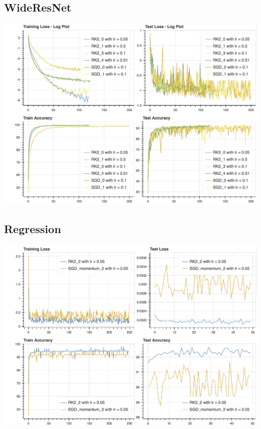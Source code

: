 \documentclass[a0,portrait]{a0poster}
\begin{document}
\begin{multicols}{3}
\subsection*{WideResNet}
\begin{center}\vspace{1cm}
\includegraphics[width=0.8\linewidth]{../plots/inf_plots/wideresnet_rk2_sgd.png}
\end{center}\vspace{1cm}
\subsection*{Regression}
\begin{center}\vspace{1cm}
\includegraphics[width=0.8\linewidth]{../plots/plots_1/lasso_3.png}
\end{center}\vspace{1cm}



\end{multicols}
\end{document}
